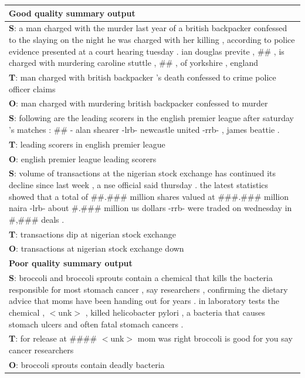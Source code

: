 \begin{table}
\begin{center}
{\small
\begin{tabular}{|p{7.5cm}|}
\hline
{\bf Good quality summary output} \\
\hline
{\bf S}: a man charged with the murder last year of a british backpacker confessed to the slaying on the night he was charged with her killing , according to police evidence presented at a court hearing tuesday .  ian douglas previte , \#\# , is charged with murdering caroline stuttle , \#\# , of yorkshire , england\\ 
{\bf T}: man charged with british backpacker 's death confessed to crime police officer claims \\
{\bf O}: man charged with murdering british backpacker confessed to murder \\
 \hline
{\bf S}: following are the leading scorers in the english premier league after saturday 's matches : \#\# - alan shearer -lrb- newcastle united -rrb- , james beattie .\\
{\bf T}: leading scorers in english premier league \\
{\bf O}: english premier league leading scorers \\
\hline
{\bf S}: volume of transactions at the nigerian stock exchange has continued its decline since last week , a nse official said thursday .  the latest statistics showed that a total of \#\#.\#\#\# million shares valued at \#\#\#.\#\#\# million naira -lrb- about \#.\#\#\# million us dollars -rrb- were traded on wednesday in \#,\#\#\# deals .\\
{\bf T}: transactions dip at nigerian stock exchange \\
{\bf O}: transactions at nigerian stock exchange down \\
\hline
{\bf Poor quality summary output} \\
\hline
{\bf S}: broccoli and broccoli sprouts contain a chemical that kills the bacteria responsible for most stomach cancer , say researchers , confirming the dietary advice that moms have been handing out for years . in laboratory tests the chemical , $<$unk$>$ , killed helicobacter pylori , a bacteria that causes stomach ulcers and often fatal stomach cancers . \\
{\bf T}:  for release at \#\#\#\# $<$unk$>$ mom was right broccoli is good for you say cancer researchers \\
{\bf O}: broccoli sprouts contain deadly bacteria \\

\end{tabular}}
\end{center}
\end{table}
